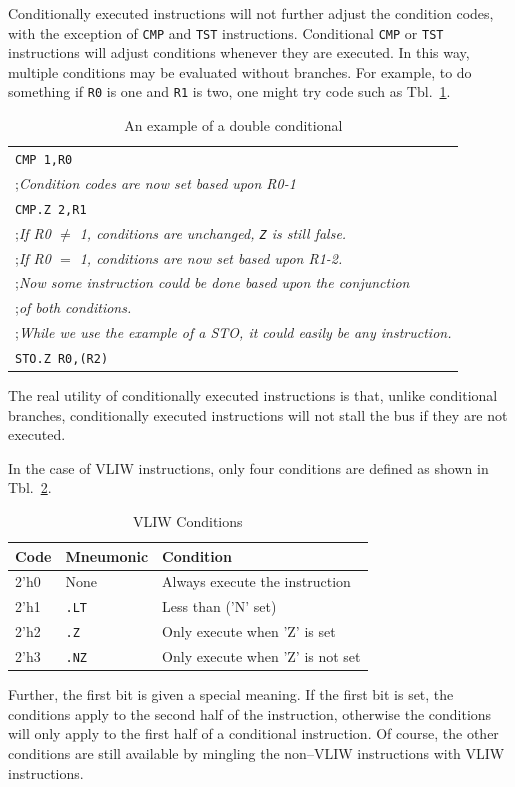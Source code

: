 \documentclass{gqtekspec}
\begin{document}
Conditionally executed instructions will not further adjust the 
condition codes, with the exception of \hbox{\tt CMP} and \hbox{\tt TST}
instructions.   Conditional \hbox{\tt CMP} or \hbox{\tt TST} instructions
will adjust conditions whenever they are executed.  In this way,
multiple conditions may be evaluated without branches.  For example, to do
something if \hbox{\tt R0} is one and \hbox{\tt R1} is two, one might try
code such as Tbl.~\ref{tbl:dbl-condition}.
\begin{table}\begin{center}
\begin{tabular}{l}
	{\tt CMP 1,R0} \\
	{;\em Condition codes are now set based upon R0-1} \\
	{\tt CMP.Z 2,R1} \\
	{;\em If R0 $\neq$ 1, conditions are unchanged, {\tt Z} is still false.} \\
	{;\em If R0 $=$ 1, conditions are now set based upon R1-2.} \\
	{;\em Now some instruction could be done based upon the conjunction} \\
	{;\em of both conditions.} \\
	{;\em While we use the example of a STO, it could easily be any instruction.} \\
	{\tt STO.Z R0,(R2)} \\
\end{tabular}
\caption{An example of a double conditional}\label{tbl:dbl-condition}
\end{center}\end{table}

The real utility of conditionally executed instructions is that, unlike
conditional branches, conditionally executed instructions will not stall
the bus if they are not executed.

In the case of VLIW instructions, only four conditions are defined as shown 
in Tbl.~\ref{tbl:vliw-conditions}.
\begin{table}\begin{center}
\begin{tabular}{l|l|l}
Code & Mneumonic & Condition \\\hline
2'h0 & None & Always execute the instruction \\
2'h1 & {\tt .LT} & Less than ('N' set) \\
2'h2 & {\tt .Z} & Only execute when 'Z' is set \\
2'h3 & {\tt .NZ} & Only execute when 'Z' is not set \\
\end{tabular}
\caption{VLIW Conditions}\label{tbl:vliw-conditions}
\end{center}\end{table}
Further, the first bit is given a special meaning.  If the first bit is set,
the conditions apply to the second half of the instruction, otherwise the
conditions will only apply to the first half of a conditional instruction.
Of course, the other conditions are still available by mingling the
non--VLIW instructions with VLIW instructions.
\end{document}
